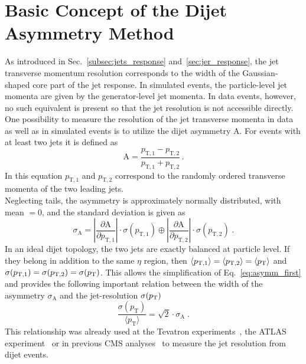 \section{Basic Concept of the Dijet Asymmetry Method}
\label{sec:jer_method}
As introduced in Sec.~\ref{subsec:jets_response} and~\ref{sec:jer_response}, the jet transverse momentum resolution corresponds to the width of the Gaussian-shaped core part of the jet response. In simulated events, the particle-level jet momenta are given by the generator-level jet momenta. In data events, however, no such equivalent is present so that the jet resolution is not accessible directly. \\
One possibility to measure the resolution of the jet transverse momenta in data as well as in simulated events is to utilize the dijet asymmetry $\mathrm{A}$. For events with at least two jets it is defined as
\begin{equation}
\label{eq:asymmdef}
  \mathrm{A} = \frac{p_\mathrm{T,1} - p_\mathrm{T,2}}{p_\mathrm{T,1} + p_\mathrm{T,2}} \, .
 \end{equation}
 In this equation $p_\mathrm{T,1}$ and $p_\mathrm{T,2}$ correspond to the randomly ordered transverse momenta of the two leading jets. \\
 Neglecting tails, the asymmetry is approximately normally distributed, with mean $= 0$, and the standard deviation is given as
 \begin{equation}
 \label{eq:asymm_first}
  {\sigma_{\mathrm{A}}} = \left\lvert \frac{\partial \mathrm{A}}{\partial p_\mathrm{T,1}} \right\rvert \cdot \sigma(p_\mathrm{T,1}) \oplus  \left\lvert \frac{\partial \mathrm{A}}{\partial p_\mathrm{T,2}} \right\rvert \cdot \sigma(p_\mathrm{T,2}) \; .
 \end{equation}
 In an ideal dijet topology, the two jets are exactly balanced at particle level. If they belong in addition to the same $\eta$ region, then $\langle p_\mathrm{T,1} \rangle = \langle p_\mathrm{T,2} \rangle = \langle p_{\text{T}} \rangle$ and $\sigma (p_\mathrm{T,1}) = \sigma (p_\mathrm{T,2}) = \sigma (p_{\text{T}})$. This allows the simplification of Eq.~\ref{eq:asymm_first} and provides the following important relation between the width of the asymmetry $\sigma_\mathrm{A}$ and the jet-\pt resolution $\sigma (p_{\text{T}})$
 \begin{equation}
 \label{eq:asymm}
  \frac{\sigma (p_\mathrm{T})}{\langle p_\mathrm{T} \rangle} = \sqrt{2} \cdot \sigma_\mathrm{A} \; .
 \end{equation}
This relationship was already used at the Tevatron experiments~\cite{oai:arXiv.org:hep-ex/0012046, JetsD0}, the ATLAS experiment~\cite{Aad:2012ag} or in previous CMS analyses~\cite{1748-0221-6-11-P11002, thesis:Schroeder} to measure the jet resolution from dijet events. 

